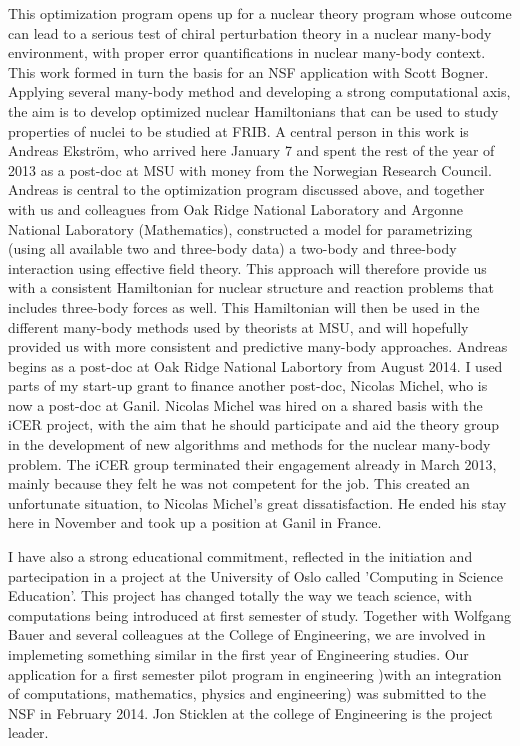 \documentclass[prc,amsart,english,twocolumn,superscriptaddress,showpacs,floatfix]{revtex4}
\begin{document}
This optimization program opens up for a nuclear theory program whose outcome can lead to a serious test of chiral perturbation theory in a nuclear many-body environment,
with proper error quantifications in  nuclear many-body context. This work formed in turn the basis for an NSF application with Scott Bogner.
Applying several many-body method and  developing a strong
computational axis, the aim is to develop optimized nuclear Hamiltonians that can be used to study properties of nuclei to be studied at FRIB. 
A central person in this work is 
Andreas Ekstr\"om, who arrived here January 7 and spent the rest of the year of 2013 as a post-doc at MSU with money from the Norwegian Research Council.
Andreas is central to the optimization program discussed above, and  together with us and 
colleagues  from Oak Ridge 
National Laboratory and Argonne National Laboratory (Mathematics), constructed a model for parametrizing (using all available two and three-body data)
a two-body and three-body interaction using effective field theory. This approach will therefore provide us with 
a consistent Hamiltonian for nuclear structure and reaction problems that includes three-body forces
as well. This Hamiltonian will then be used in the different many-body methods used by theorists at MSU, 
and will hopefully provided us with more consistent and predictive many-body approaches. Andreas begins as a post-doc at Oak Ridge National Labortory from August 2014. I used parts of my start-up grant to finance another post-doc, Nicolas Michel, who is now a post-doc at Ganil. 
Nicolas Michel was hired on a shared basis with the iCER project,
with the aim that he should participate and aid the theory group in the development 
of new algorithms and methods for the nuclear many-body problem.  The iCER group terminated their engagement already in March 2013, mainly because they felt he was not competent for the job. This created an unfortunate situation, to Nicolas Michel's great dissatisfaction. He ended his stay here in November and took up a position at Ganil in France. 



I have also a strong educational commitment, reflected in the initiation and partecipation in a project at the University of Oslo called 'Computing in Science Education'. This project has changed totally the way we teach science, with computations being introduced at first semester of study. 
Together with Wolfgang Bauer and several colleagues at the College of Engineering, we are involved in implemeting something similar in the first
year of Engineering studies. Our application for a first semester pilot program in engineering )with an integration of computations, mathematics, physics and engineering) was submitted to the NSF in February 2014. Jon Sticklen at the college of Engineering is the project leader.
\end{document}
